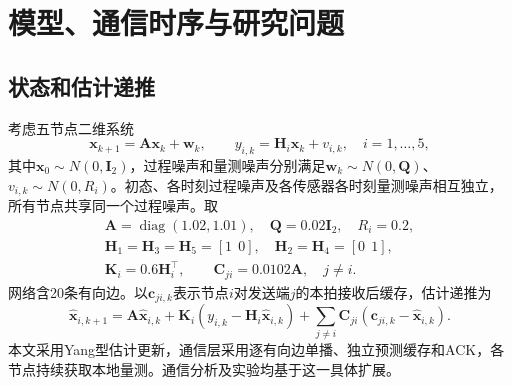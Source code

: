\documentclass[UTF8,a4paper,zihao=5,fontset=windows]{ctexart}
\newcommand{\diag}{\operatorname{diag}}
\begin{document}
\section{模型、通信时序与研究问题}
\subsection{状态和估计递推}
考虑五节点二维系统
\begin{equation}
{\bm{x}}_{k+1}={\bm{A}}{\bm{x}}_k+{\bm{w}}_k,\qquad y_{i,k}={\bm{H}}_i {\bm{x}}_k+v_{i,k},\quad i=1,\ldots,5,
\label{eq:system}
\end{equation}
其中${\bm{x}}_0\sim N(0,{\bm{I}}_2)$，过程噪声和量测噪声分别满足${\bm{w}}_k\sim N(0,{\bm{Q}})$、$v_{i,k}\sim N(0,R_i)$。初态、各时刻过程噪声及各传感器各时刻量测噪声相互独立，所有节点共享同一个过程噪声。取
\begin{equation}
\begin{gathered}
{\bm{A}}=\diag(1.02,1.01),\quad {\bm{Q}}=0.02{\bm{I}}_2,\quad R_i=0.2,\\
{\bm{H}}_1={\bm{H}}_3={\bm{H}}_5=[1\ \ 0],\quad {\bm{H}}_2={\bm{H}}_4=[0\ \ 1],\\
{\bm{K}}_i=0.6{\bm{H}}_i^\top,\qquad {\bm{C}}_{ji}=0.0102{\bm{A}},\quad j\ne i.
\end{gathered}\label{eq:parameters}
\end{equation}
网络含20条有向边。以${\bm{c}}_{ji,k}$表示节点$i$对发送端$j$的本拍接收后缓存，估计递推为
\begin{equation}
\hat {\bm{x}}_{i,k+1}={\bm{A}}\hat {\bm{x}}_{i,k}
+{\bm{K}}_i(y_{i,k}-{\bm{H}}_i\hat {\bm{x}}_{i,k})
+\sum_{j\ne i}{\bm{C}}_{ji}({\bm{c}}_{ji,k}-\hat {\bm{x}}_{i,k}).
\label{eq:yang}
\end{equation}
本文采用Yang型估计更新，通信层采用逐有向边单播、独立预测缓存和ACK，各节点持续获取本地量测。通信分析及实验均基于这一具体扩展。
\end{document}
